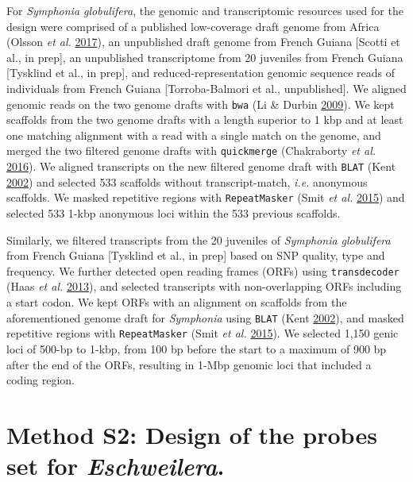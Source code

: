 \documentclass[12pt,]{article}
\begin{document}
For \emph{Symphonia globulifera}, the genomic and transcriptomic resources used for the design were comprised of a published low-coverage draft genome from Africa (Olsson \emph{et al.} \protect\hyperlink{ref-Olsson2017}{2017}), an unpublished draft genome from French Guiana {[}Scotti et al., in prep{]}, an unpublished transcriptome from 20 juveniles from French Guiana {[}Tysklind et al., in prep{]}, and reduced-representation genomic sequence reads of individuals from French Guiana {[}Torroba-Balmori et al., unpublished{]}.
We aligned genomic reads on the two genome drafts with \texttt{bwa} (Li \& Durbin \protect\hyperlink{ref-Li2009}{2009}).
We kept scaffolds from the two genome drafts with a length superior to 1 kbp and at least one matching alignment with a read with a single match on the genome, and merged the two filtered genome drafts with \texttt{quickmerge} (Chakraborty \emph{et al.} \protect\hyperlink{ref-Chakraborty2016}{2016}).
We aligned transcripts on the new filtered genome draft with \texttt{BLAT} (Kent \protect\hyperlink{ref-Kent2002}{2002}) and selected 533 scaffolds without transcript-match, \emph{i.e.} anonymous scaffolds.
We masked repetitive regions with \texttt{RepeatMasker} (Smit \emph{et al.} \protect\hyperlink{ref-Smit2015}{2015}) and selected 533 1-kbp anonymous loci within the 533 previous scaffolds.

Similarly, we filtered transcripts from the 20 juveniles of \emph{Symphonia globulifera} from French Guiana {[}Tysklind et al., in prep{]} based on SNP quality, type and frequency.
We further detected open reading frames (ORFs) using \texttt{transdecoder} (Haas \emph{et al.} \protect\hyperlink{ref-Haas2013}{2013}),
and selected transcripts with non-overlapping ORFs including a start codon.
We kept ORFs with an alignment on scaffolds from the aforementioned genome draft for \emph{Symphonia} using \texttt{BLAT} (Kent \protect\hyperlink{ref-Kent2002}{2002}),
and masked repetitive regions with \texttt{RepeatMasker} (Smit \emph{et al.} \protect\hyperlink{ref-Smit2015}{2015}).
We selected 1,150 genic loci of 500-bp to 1-kbp, from 100 bp before the start to a maximum of 900 bp after the end of the ORFs, resulting in 1-Mbp genomic loci that included a coding region.

\newpage

\hypertarget{method-s2-design-of-the-probes-set-for-eschweilera.}{%
\section{\texorpdfstring{Method S2: Design of the probes set for \emph{Eschweilera}.}{Method S2: Design of the probes set for Eschweilera.}}\label{method-s2-design-of-the-probes-set-for-eschweilera.}}
\end{document}
